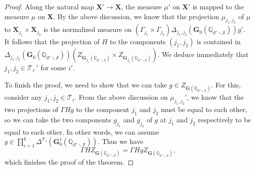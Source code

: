 \documentclass[11pt,oneside,reqno]{amsart}
\newcommand{\Q}{\mathbb{Q}}
\newcommand{\Scal}{\mathcal{S}}
\newcommand{\Tcal}{\mathcal{T}}
\newcommand{\Gbf}{\mathbf{G}}
\newcommand{\Xbf}{\mathbf{X}}
\theoremstyle{plain}
\begin{document}
\begin{proof}
		
		
		Along the natural map $\Xbf'\to\Xbf$, the measure $\mu'$ on $\Xbf'$ is mapped to the measure $\mu$ on $\Xbf$. By the above discussion, we know that the projection $\mu_{j_1,j_2}$ of $\mu$ to $\Xbf_{j_1}\times\Xbf_{j_2}$ is the normalized measure on $(\Gamma_{j_1}\times\Gamma_{j_2})\Delta_{j_1,j_2}(\Gbf_0(\Q_{\Scal'\backslash\Scal}))g'$. It follows that the projection of $H$ to the components $(j_1,j_2)$ is contained in $\Delta_{j_1,j_2}(\Gbf_0(\Q_{\Scal'\backslash\Scal}))(Z_{\Gbf_{j_1}(\Q_{\Scal'\backslash\Scal})}\times Z_{\Gbf_{j_2}(\Q_{\Scal'\backslash\Scal})})$. We deduce immediately that $j_1,j_2\in\Tcal_{i'}'$ for some $i'$.
		
		
		
		
		To finish the proof, we need to show that we can take $g\in Z_{\Gbf(\Q_{\Scal'\backslash\Scal})}$.
		For this, consider any $j_1,j_2\in\Tcal_i$. From the above discussion on $\mu_{j_1,j_2}'$, we know that the two projections of $\Gamma Hg$ to the component $j_1$ and $j_2$ must be equal to each other, so we can take the two components $g_{j_1}$ and $g_{j_2}$ of $g$ at $j_1$ and $j_2$ respectively to be equal to each other. In other words, we can assume $g\in\prod_{i=1}^k\Delta^{\Tcal_i}(\Gbf_0^1(\Q_{\Scal'\backslash\Scal}))$. Thus we have
		\[
		\Gamma HZ_{\Gbf(\Q_{\Scal'\backslash\Scal})}
		=
		\Gamma HgZ_{\Gbf(\Q_{\Scal'\backslash\Scal})},
		\]
		which finishes the proof of the theorem.
	\end{proof}
	
	
	
	
	
	
	
	
	
	
	
	
	
	
	
	
	
	
	
	
	
	
	
	
	
	
	
	
	
	
	
	
	
	
	
	
	
	
	
	
	
	
	
	
	
	
	
	
	
\end{document}
